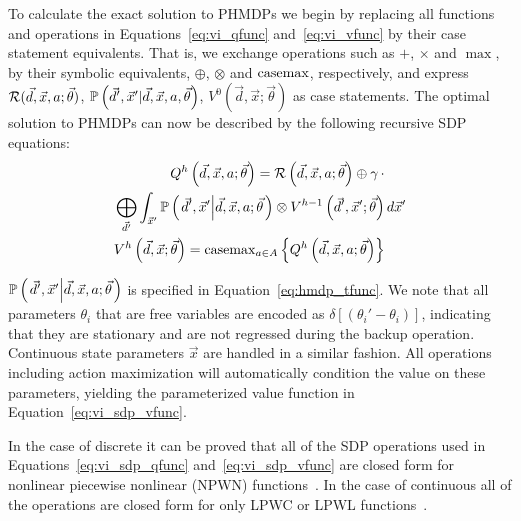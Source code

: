 To calculate the exact solution to PHMDPs we begin by replacing all functions and operations in Equations~\eqref{eq:vi_qfunc} and~\eqref{eq:vi_vfunc} by their case statement equivalents. That is, we exchange operations such as {\footnotesize$+$}, {\footnotesize$\times$} and {\footnotesize$\max$}, by their symbolic equivalents, {\footnotesize$\oplus$}, {\footnotesize$\otimes$} and $\mathrm{casemax}$, respectively, and express {\footnotesize $\mathcal{R}(\vec{d}, \vec{x}, a; \vec{\theta})$},  {\footnotesize $\mathbb{P}\left({\vec{d}', \vec{x}' | \vec{d}, \vec{x}, a, \vec{\theta}}\right)$}, {\footnotesize $V^0(\vec{d}, \vec{x}; \vec{\theta})$} as case statements. The optimal solution to PHMDPs can now be described by the following recursive SDP equations:
{\footnotesize 
    \abovedisplayskip=0pt
    \belowdisplayskip=0pt
    \begin{align}
        Q^{h} \left( \vec{d}, \vec{x}, a; \vec{\theta} \right) = \mathcal{R} \left( \vec{d}, \vec{x}, a; \vec{\theta} \right) \oplus \gamma \, \cdot &  \nonumber \\ 
        \bigoplus_{\vec{d}'} \int_{\vec{x}'} \mathbb{P}\left({ \left. \vec{d}', \vec{x}' \middle| \vec{d}, \vec{x}, a; \vec{\theta} \right.}\right) \otimes V^{h-1} \left( \vec{d}', \vec{x}'; \vec{\theta} \right) & \, d\vec{x}'  \label{eq:vi_sdp_qfunc} \\
        V^{h}\left( \vec{d}, \vec{x}; \vec{\theta} \right) = \mathrm{casemax}_{a \in A} \left\{ Q^{h} \left( \vec{d}, \vec{x}, a; \vec{\theta} \right) \right\} & \label{eq:vi_sdp_vfunc}
    \end{align}
}%

{\footnotesize $\mathbb{P}\left({\left. \vec{d}', \vec{x}' \middle| \vec{d}, \vec{x}, a; \vec{\theta} \right.}\right)$ } is specified in Equation~\eqref{eq:hmdp_tfunc}. We note that all parameters {\footnotesize $\theta_i$} that are free variables 
are encoded as {\footnotesize $\delta\left[\left(\theta_i' - \theta_i\right)\right]$}, indicating that they are stationary and are not regressed during the backup operation. Continuous state parameters {\footnotesize $ \vec{x} $} are handled in a similar fashion. All operations including action maximization will automatically condition the value on these parameters, yielding the parameterized value function in Equation~\eqref{eq:vi_sdp_vfunc}.

In the case of discrete {\footnotesize \Action} it can be proved that all of the SDP operations used in Equations~\eqref{eq:vi_sdp_qfunc} and~\eqref{eq:vi_sdp_vfunc} are closed form for nonlinear piecewise nonlinear (NPWN) functions~\parencite{Sanner_UAI_2011}. In the case of continuous {\footnotesize \Action} all of the operations are closed form for only LPWC or LPWL functions~\parencite{Zamani_AAAI_2012}.


